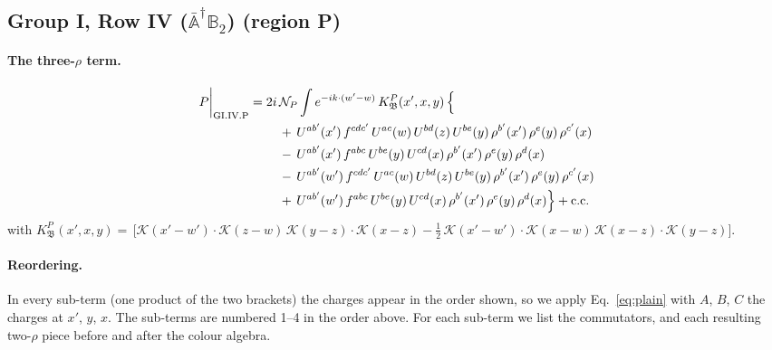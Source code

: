 \documentclass[10pt]{article}
\numberwithin{equation}{section}
\newcommand{\KK}{\mathcal K}
\newcommand{\NP}{\mathcal N_{P}}
\begin{document}
\subsection{Group I, Row IV ($\bar{\mathbb A}^\dagger\mathbb B_2$) (region P)}\label{sec:GI.IV.P}

\paragraph{The three-$\rho$ term.}
\begin{align}
P\bigg|_{\rm GI.IV.P}={}&2i\,\NP\int e^{-ik\cdot(w'-w)}\,K^{P}_{\mathfrak B}(x',x,y)\,\Big\{\notag\\
&\quad +\,U^{ab'}(x')\,f^{cdc'}\,U^{ac}(w)\,U^{bd}(z)\,U^{be}(y)\,\rho^{b'}(x')\,\rho^{e}(y)\,\rho^{c'}(x)\notag\\
&\quad -\,U^{ab'}(x')\,f^{abc}\,U^{be}(y)\,U^{cd}(x)\,\rho^{b'}(x')\,\rho^{e}(y)\,\rho^{d}(x)\notag\\
&\quad -\,U^{ab'}(w')\,f^{cdc'}\,U^{ac}(w)\,U^{bd}(z)\,U^{be}(y)\,\rho^{b'}(x')\,\rho^{e}(y)\,\rho^{c'}(x)\notag\\
&\quad +\,U^{ab'}(w')\,f^{abc}\,U^{be}(y)\,U^{cd}(x)\,\rho^{b'}(x')\,\rho^{e}(y)\,\rho^{d}(x)\Big\}+{\rm c.c.}\label{eq:in-GI.IV.P}
\end{align}
with $K^{P}_{\mathfrak B}(x',x,y)=\,\Big[\KK(x'-w')\cdot\KK(z-w)\,\KK(y-z)\cdot\KK(x-z)-\frac{1}{2}\,\KK(x'-w')\cdot\KK(x-w)\,\KK(x-z)\cdot\KK(y-z)\Big]$.
\paragraph{Reordering.} In every sub-term (one product of the two brackets) the charges appear in the order shown, so we apply Eq.~\eqref{eq:plain} with $A$, $B$, $C$ the charges at $x'$, $y$, $x$. The sub-terms are numbered 1--4 in the order above. For each sub-term we list the commutators, and each resulting two-$\rho$ piece before and after the colour algebra.
\end{document}
